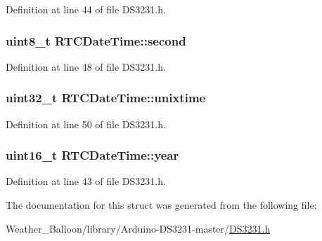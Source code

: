 Definition at line 44 of file D\+S3231.\+h.

\subsubsection[{\texorpdfstring{second}{second}}]{\setlength{\rightskip}{0pt plus 5cm}uint8\+\_\+t R\+T\+C\+Date\+Time\+::second}\hypertarget{struct_r_t_c_date_time_acf01c0fbd1d95fe33238674641f40027}{}\label{struct_r_t_c_date_time_acf01c0fbd1d95fe33238674641f40027}


Definition at line 48 of file D\+S3231.\+h.

\subsubsection[{\texorpdfstring{unixtime}{unixtime}}]{\setlength{\rightskip}{0pt plus 5cm}uint32\+\_\+t R\+T\+C\+Date\+Time\+::unixtime}\hypertarget{struct_r_t_c_date_time_af46df69448c5456b54e9acae7629efa8}{}\label{struct_r_t_c_date_time_af46df69448c5456b54e9acae7629efa8}


Definition at line 50 of file D\+S3231.\+h.

\subsubsection[{\texorpdfstring{year}{year}}]{\setlength{\rightskip}{0pt plus 5cm}uint16\+\_\+t R\+T\+C\+Date\+Time\+::year}\hypertarget{struct_r_t_c_date_time_a265de5469447ed7581fec4d3c0c5814d}{}\label{struct_r_t_c_date_time_a265de5469447ed7581fec4d3c0c5814d}


Definition at line 43 of file D\+S3231.\+h.



The documentation for this struct was generated from the following file\+:\begin{DoxyCompactItemize}
\item 
Weather\+\_\+\+Balloon/library/\+Arduino-\/\+D\+S3231-\/master/\hyperlink{_d_s3231_8h}{D\+S3231.\+h}\end{DoxyCompactItemize}
